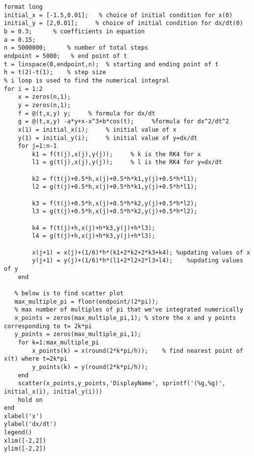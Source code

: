\lstset{basicstyle=\footnotesize,style=myCustomMatlabStyle}
\begin{lstlisting}
format long
initial_x = [-1.5,0.01];   % choice of initial condition for x(0)
initial_y = [2,0.01];     % choice of initial condition for dx/dt(0)
b = 0.3;      % coefficients in equation
a = 0.15;
n = 5000000;      % number of total steps
endpoint = 5000;   % end point of t 
t = linspace(0,endpoint,n);  % starting and ending point of t
h = t(2)-t(1);    % step size
% i loop is used to find the numerical integral
for i = 1:2
    x = zeros(n,1);
    y = zeros(n,1);
    f = @(t,x,y) y;     % formula for dx/dt
    g = @(t,x,y) -a*y+x-x^3+b*cos(t);     %formula for dx^2/dt^2
    x(1) = initial_x(i);     % initial value of x
    y(1) = initial_y(i);     % initial value of y=dx/dt
    for j=1:n-1
        k1 = f(t(j),x(j),y(j));     % k is the RK4 for x
        l1 = g(t(j),x(j),y(j));     % l is the RK4 for y=dx/dt

        k2 = f(t(j)+0.5*h,x(j)+0.5*h*k1,y(j)+0.5*h*l1);
        l2 = g(t(j)+0.5*h,x(j)+0.5*h*k1,y(j)+0.5*h*l1);

        k3 = f(t(j)+0.5*h,x(j)+0.5*h*k2,y(j)+0.5*h*l2);
        l3 = g(t(j)+0.5*h,x(j)+0.5*h*k2,y(j)+0.5*h*l2);

        k4 = f(t(j)+h,x(j)+h*k3,y(j)+h*l3);
        l4 = g(t(j)+h,x(j)+h*k3,y(j)+h*l3);

        x(j+1) = x(j)+(1/6)*h*(k1+2*k2+2*k3+k4); %updating values of x
        y(j+1) = y(j)+(1/6)*h*(l1+2*l2+2*l3+l4);    %updating values of y
    end
    
   % below is to find scatter plot
   max_multiple_pi = floor(endpoint/(2*pi));    
   % max number of multiples of pi that we've integrated numerically
   x_points = zeros(max_multiple_pi,1); % store the x and y points corresponding to t= 2k*pi
   y_points = zeros(max_multiple_pi,1);
    for k=1:max_multiple_pi
        x_points(k) = x(round(2*k*pi/h));    % find nearest point of x(t) where t=2k*pi
        y_points(k) = y(round(2*k*pi/h));   
    end
    scatter(x_points,y_points,'DisplayName', sprintf('(%g,%g)', initial_x(i), initial_y(i)))
    hold on
end
xlabel('x')
ylabel('dx/dt')
legend()
xlim([-2,2])
ylim([-2,2])

\end{lstlisting}